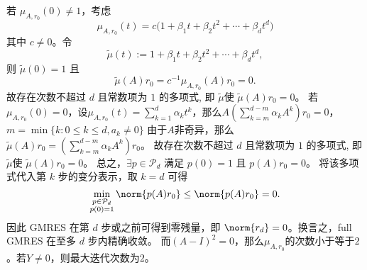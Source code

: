 \documentclass{ctexart}
\begin{document}
\begin{solution}
  若 \(\mu_{A,r_0}(0)\neq 1\)，考虑
  \[
    \mu_{A,r_0}(t) = c\big(1+\beta_1 t+\beta_2 t^2+\cdots+\beta_d t^d\big)
  \]
  其中 \(c\neq0\)。令
  \[
    \tilde\mu(t) := 1+\beta_1 t+\beta_2 t^2+\cdots+\beta_d t^d,
  \]
  则 \(\tilde\mu(0)=1\) 且
  \[
    \tilde\mu(A) r_0 = c^{-1}\mu_{A,r_0}(A) r_0 = 0.
  \]
  故存在次数不超过 \(d\) 且常数项为 \(1\) 的多项式, 即 \(\tilde\mu\)使 \(\tilde\mu(A)r_0=0\)。
  若 \(\mu_{A,r_0}(0)=0\)，设\(\mu_{A,r_0}(t)=\sum_{k=1}^{d}\alpha_k t^k \)，那么\(A(\sum_{k=m}^{d-m}\alpha_k A^k)r_0=0 \)，\(m=\min\{k : 0 \leq k \leq d, a_k \neq 0\} \)
  由于\(A \)非奇异，那么\( \tilde{\mu}(A)r_0=(\sum_{k=m}^{d-m}\alpha_kA^k)r_0\)。
  故存在次数不超过 \(d\) 且常数项为 \(1\) 的多项式, 即 \(\tilde\mu\)使 \(\tilde\mu(A)r_0=0\)。
  总之，\( \exists p\in\mathcal P_d\) 满足 \(p(0)=1\) 且 \(p(A)r_0=0\)。
  将该多项式代入第 \(k\) 步的变分表示，取 \(k=d\) 可得
  \[
    \min_{\substack{p\in\mathcal P_d\\ p(0)=1}}\norm{p(A)r_0} \le \norm{p(A)r_0} = 0.
  \]
  因此 GMRES 在第 \(d\) 步或之前可得到零残量，即 \(\norm{r_d}=0\)。换言之，full GMRES 在至多 \(d\) 步内精确收敛。
  而\((A-I)^2=0 \)，那么\(\mu_{A,r_0} \)的次数小于等于\(2 \)。若\(Y \neq 0 \)，则最大迭代次数为\(2 \)。
\end{solution}
\end{document}
